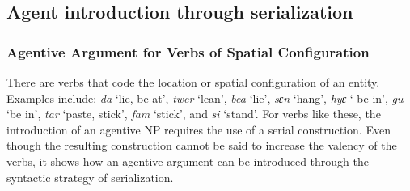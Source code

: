 \documentclass[output=paper]{langsci/langscibook}
\begin{document}
\ea
\label{ex:42.osam}
	\z

	\z
\z


\ea
\label{ex:43.osam}
	\z

	\z
\z


\subsection{Agent introduction through serialization}\label{§5.2:agent.osam}
\subsubsection{Agentive Argument for Verbs of Spatial Configuration}\label{§5.2.1:agentive.osam}

There are verbs that code the location or spatial configuration of an entity. Examples  include: \textit{da} `lie, be at', \textit{twer} `lean', \textit{bea} `lie', \textit{sɛn} `hang', \textit{hyɛ} ` be in', \textit{gu} `be in', \textit{tar} `paste, stick', \textit{fam} `stick', and \textit{si} `stand'. For verbs like these, the introduction of an agentive NP requires the use of a serial construction. Even though the resulting construction cannot be said to increase the valency of the verbs, it shows how an agentive argument can be introduced through the syntactic strategy of serialization.
\end{document}
